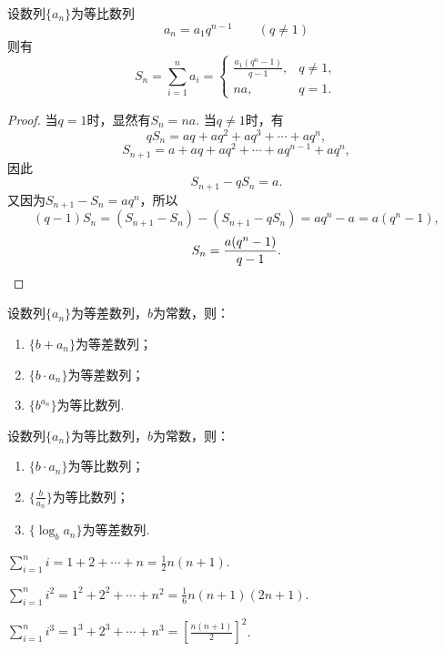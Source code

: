\begin{property}[等比数列求和]
设数列\(\{a_n\}\)为等比数列\[
a_n = a_1 q^{n-1} \qquad (q \neq 1)
\]则有\[
S_n = \sum\limits_{i=1}^n a_i
= \left\{ \begin{array}{cl}
\frac{a_1 (q^n-1)}{q-1}, & q \neq 1, \\
na, & q = 1.
\end{array} \right.
\]
\begin{proof}
当\(q = 1\)时，显然有\(S_n = na\).
当\(q \neq 1\)时，有\[
q S_n = aq+aq^2+aq^3+\dotsb+aq^n,
\]\[
S_{n+1} = a+aq+aq^2+\dotsb+aq^{n-1}+aq^n,
\]因此\[
S_{n+1} - q S_n = a.
\]又因为\(S_{n+1} - S_n = aq^n\)，所以\[
(q-1) S_n = (S_{n+1} - S_n) - (S_{n+1} - q S_n) = aq^n - a = a(q^n - 1),
\]\[
S_n = \frac{a(q^n - 1)}{q-1}.
\qedhere
\]
\end{proof}
\end{property}

\begin{property}
设数列\(\{a_n\}\)为等差数列，\(b\)为常数，则：
\begin{enumerate}
\item \(\{b + a_n\}\)为等差数列；
\item \(\{b \cdot a_n\}\)为等差数列；
\item \(\{b^{a_n}\}\)为等比数列.
\end{enumerate}
\end{property}

\begin{property}
设数列\(\{a_n\}\)为等比数列，\(b\)为常数，则：
\begin{enumerate}
\item \(\{b \cdot a_n\}\)为等比数列；
\item \(\{\frac{b}{a_n}\}\)为等比数列；
\item \(\{\log_b a_n\}\)为等差数列.
\end{enumerate}
\end{property}

\begin{example}
\(\sum\limits_{i=1}^n i = 1 + 2 + \dotsb + n = \frac{1}{2} n(n+1)\).
\end{example}

\begin{example}
\(\sum\limits_{i=1}^n i^2 = 1^2 + 2^2 + \dotsb + n^2 = \frac{1}{6} n(n+1)(2n+1)\).
\end{example}

\begin{example}
\(\sum\limits_{i=1}^n i^3 = 1^3 + 2^3 + \dotsb + n^3 = \left[\frac{n(n+1)}{2}\right]^2\).
\end{example}

